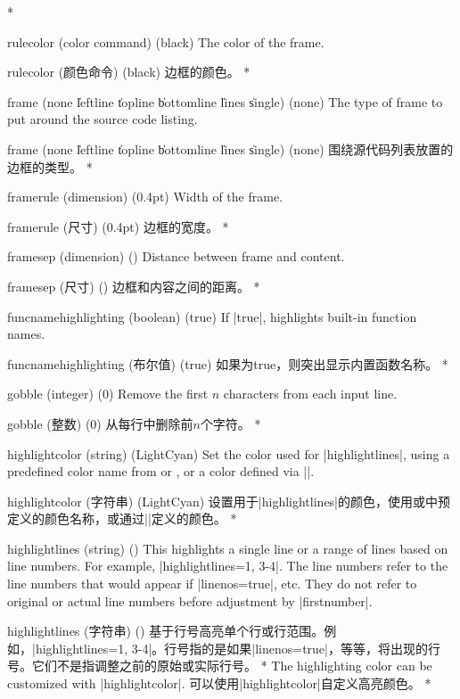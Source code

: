 \begin{optionlist}
\begin{paracol}{2}
\switchcolumn[0]*%
\item[rulecolor (color command) (black)]
The color of the frame.
\switchcolumn
\item[rulecolor (颜色命令) (black)]
边框的颜色。
\switchcolumn[0]*%
\item[frame (none \| leftline \| topline \| bottomline \| lines \| single) (none)]
The type of frame to put around the source code listing.
\switchcolumn
\item[frame (none \| leftline \| topline \| bottomline \| lines \| single) (none)]
围绕源代码列表放置的边框的类型。
\switchcolumn[0]*%
\item[framerule (dimension) (0.4pt)]
Width of the frame.
\switchcolumn
\item[framerule (尺寸) (0.4pt)]
边框的宽度。
\switchcolumn[0]*%
  \item[framesep (dimension) (\cmd\fboxsep)]
    Distance between frame and content.
    \switchcolumn
    \item[framesep (尺寸) (\cmd\fboxsep)]
    边框和内容之间的距离。
\switchcolumn[0]*%
  \item[funcnamehighlighting (boolean) (true)] 
    If |true|, highlights built-in function names.
    \switchcolumn
    \item[funcnamehighlighting (布尔值) (true)] 
    如果为true，则突出显示内置函数名称。
\switchcolumn[0]*%
  \item[gobble (integer) (0)]
    Remove the first $n$ characters from each input line.
    \switchcolumn
    \item[gobble (整数) (0)]
    从每行中删除前$n$个字符。
    \switchcolumn[0]*%
\item[highlightcolor (string) (LightCyan)]
Set the color used for |highlightlines|, using a predefined color name from  or , or a color defined via |\definecolor|.
\switchcolumn
\item[highlightcolor (字符串) (LightCyan)]
设置用于|highlightlines|的颜色，使用或中预定义的颜色名称，或通过|\definecolor|定义的颜色。
\switchcolumn[0]*%

\item[highlightlines (string) (\meta{none})]
This highlights a single line or a range of lines based on line numbers.  For example, |highlightlines={1, 3-4}|.  The line numbers refer to the line numbers that would appear if |linenos=true|, etc.  They do not refer to original or actual line numbers before adjustment by |firstnumber|.
\switchcolumn
\item[highlightlines (字符串) (\meta{无})]
基于行号高亮单个行或行范围。例如，|highlightlines={1, 3-4}|。行号指的是如果|linenos=true|，等等，将出现的行号。它们不是指调整之前的原始或实际行号。
\switchcolumn[0]*%
The highlighting color can be customized with |highlightcolor|.
\switchcolumn
可以使用|highlightcolor|自定义高亮颜色。
\switchcolumn[0]*%


\end{paracol}
\end{optionlist}
